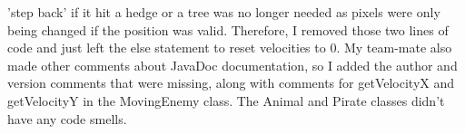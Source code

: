 \documentclass[12pt, letterpaper]{article}
\begin{document}
'step back' if it hit a hedge or a tree was no longer needed as pixels were only being changed if the position was valid. Therefore, I removed those two lines of code and just left the else statement to reset velocities to 0. My team-mate also made other comments about JavaDoc documentation, so I added the author and version comments that were missing, along with comments for getVelocityX and getVelocityY in the MovingEnemy class. The Animal and Pirate classes didn't have any code smells.
\end{document}
